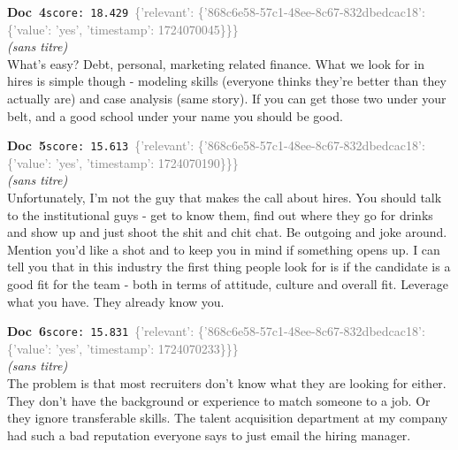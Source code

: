 \documentclass[a4paper,11pt]{article}
\begin{document}
\begin{docenv}
{\footnotesize\textcolor{doccolor}{\textbf{Doc~4}}}\hfill{\tiny\texttt{score:~18.429}}\ {\tiny\textcolor{gray}{\{'relevant': \{'868c6e58-57c1-48ee-8c67-832dbedcac18': \{'value': 'yes', 'timestamp': 1724070045\}\}\}}}\\[3pt]
{\small\textit{(sans titre)}}\\[2pt]
\vspace{2pt}
{\footnotesize 
What's easy? Debt, personal, marketing related finance.   What we look for in hires is simple though - modeling skills (everyone thinks they're better than they actually are) and case analysis (same story). If you can get those two under your belt, and a good school under your name you should be good.}
\end{docenv}
\begin{docenv}
{\footnotesize\textcolor{doccolor}{\textbf{Doc~5}}}\hfill{\tiny\texttt{score:~15.613}}\ {\tiny\textcolor{gray}{\{'relevant': \{'868c6e58-57c1-48ee-8c67-832dbedcac18': \{'value': 'yes', 'timestamp': 1724070190\}\}\}}}\\[3pt]
{\small\textit{(sans titre)}}\\[2pt]
\vspace{2pt}
{\footnotesize 
Unfortunately, I'm not the guy that makes the call about hires.  You should talk to the institutional guys - get to know them, find out where they go for drinks and show up and just shoot the shit and chit chat. Be outgoing and joke around.  Mention you'd like a shot and to keep you in mind if something opens up. I can tell you that in this industry the first thing people look for is if the candidate is a good fit for the team - both in terms of attitude, culture and overall fit.   Leverage what you have.  They already know you.}
\end{docenv}
\begin{docenv}
{\footnotesize\textcolor{doccolor}{\textbf{Doc~6}}}\hfill{\tiny\texttt{score:~15.831}}\ {\tiny\textcolor{gray}{\{'relevant': \{'868c6e58-57c1-48ee-8c67-832dbedcac18': \{'value': 'yes', 'timestamp': 1724070233\}\}\}}}\\[3pt]
{\small\textit{(sans titre)}}\\[2pt]
\vspace{2pt}
{\footnotesize 
The problem is that most recruiters don't know what they are looking for either. They don't have the background or experience to match someone to a job. Or they ignore transferable skills. The talent acquisition department at my company had such a bad reputation everyone says to just email the hiring manager.}
\end{docenv}
\end{document}
